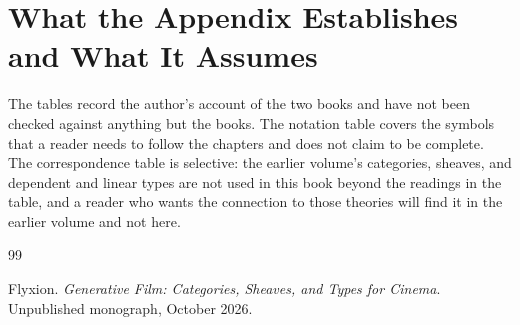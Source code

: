 \documentclass[11pt,twoside,openright]{book}
\theoremstyle{plain}
\theoremstyle{definition}
\theoremstyle{remark}
\begin{document}
\section{What the Appendix Establishes and What It Assumes}\label{sec:limits-c}

The tables record the author's account of the two books and have not been checked against anything but the books. The notation table covers the symbols that a reader needs to follow the chapters and does not claim to be complete. The correspondence table is selective: the earlier volume's categories, sheaves, and dependent and linear types are not used in this book beyond the readings in the table, and a reader who wants the connection to those theories will find it in the earlier volume and not here.

\begin{thebibliography}{99}

Flyxion.
\newblock \emph{Generative Film: Categories, Sheaves, and Types for Cinema}.
\newblock Unpublished monograph, October 2026.

\end{thebibliography}
\end{document}
